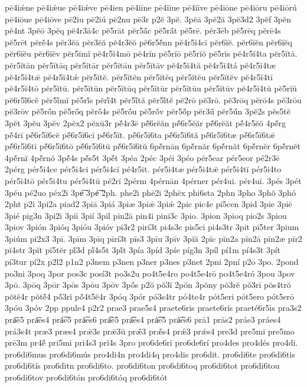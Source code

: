 {pē4iǽne
pē4iǽue
pē4iǽve
pē4ien
pē4iīne
pē4iīue
pē4iīve
pē4iōne
pē4iōru
pē4iōrú
pē4iōue
pē4iōve
pē2iu
pē2iú
pē2nu
pē3r
p2ĕ
3pĕ.
3pĕā
3pĕ2ă
3pĕ3d2
3pĕf
3pĕn
pĕ4nt
3pĕō
3pĕq
pĕ4r3ā4c
pĕ5rāt
pĕr5ā́c
pĕ5rā́t
pĕ5rē.
pĕr3ēb
pĕ5rēq
pĕrē4s
pĕ5rēt
pĕrḗ4s
pĕr3ĕā
pĕr3ĕă
pĕ4r3ĕŏ
pĕ6r5ĕ́nn
pĕ4r5ĭ4cī
pĕr6ĭĕ.
pĕr6ĭĕn
pĕr6ĭĕq
pĕr6ĭĕu
pĕr6ĭĕv
pĕr5ĭmĭ
pĕ4r5ĭ4mō
pĕ4rĭn
pĕ5rĭō
pĕ5rĭŏ
pĕ5rĭs
pĕ4r5ĭ4ta
pĕr5ĭtā.
pĕr5ĭtān
pĕr5ĭtāq
pĕr5ĭtār
pĕr5ĭtāu
pĕr5ĭtāv
pĕ4r5ĭ4tă
pĕ4r5ĭ4tá
pĕ4r5ĭ4tæ
pĕ4r5ĭ4tǣ
pĕ4r5ĭ4tǽ
pĕr5ĭtĕ.
pĕr5ĭtĕn
pĕr5ĭtĕq
pĕr5ĭtĕu
pĕr5ĭtĕv
pĕ4r5ĭ4tī
pĕ4r5ĭ4tō
pĕr5ĭtū.
pĕr5ĭtūn
pĕr5ĭtūq
pĕr5ĭtūr
pĕr5ĭtūu
pĕr5ĭtūv
pĕ4r5ĭ4tŭ
pĕ5rĭŭ
pĕ6r5ĭ́6cĕ
pĕr5ĭ́mĭ
pĕ5rĭ́s
pĕrĭ́4t
pĕr5ĭ́tă
pĕr5ĭ́tĕ
pĕ2rō
pĕ3rō.
pĕ3rōq
pĕrō4s
pĕ3rōu
pĕ3rōv
pĕ5rṓn
pĕ5rṓq
pĕrṓ4s
pĕ5rṓu
pĕ5rṓv
pĕr5ŏ́p
pĕr3ū́
pĕr5ŭ́n
3pĕ2s
pĕs5tĕ
3pĕt
3pĕu
3pĕv
2pĕx2
pĕxū3r
pĕ́4r3ē
pĕ́6rĕăn
pĕ́6r5ĕăr
pĕ́6rĕăt
pĕ́4r5ĕŏ
4pĕ́rg
pĕ́4rī
pĕ́6r5ĭ6cĕ
pĕ́6r5ĭ6cī
pĕ́6r5ĭt.
pĕ́6r5ĭ6ta
pĕ́6r5ĭ6tă
pĕ́6r5ĭ6tæ
pĕ́6r5ĭ6tǣ
pĕ́6r5ĭ6tī
pĕ́6r5ĭ6tō
pĕ́6r5ĭ6tū
pĕ́6r5ĭ6tŭ
6pĕ́rnān
6pĕ́rnăr
6pĕ́rnăt
6pĕ́rnĕr
6pĕ́rnĕt
4pĕ́rnĭ
4pĕ́rnŏ
3pĕ́4s
pĕ́s5t
3pĕ́t
3péa
2péc
3péi
3péo
pér5ear
pér5eor
pé2r3ē
2pérg
pér5i4ce
pér5i4ci
pér5i4cī
pé4r5it.
pér5i4tæ
pér5i4tǣ
pér5i4tī
pér5i4to
pér5i4tō
pér5i4tu
pér5i4tū
pé2rī
2pérm
4pérnān
4pérner
pér4ui.
pér4uī.
3pés
3pét
3péu
pé2uo
péx2ī
3pé͞
3pé͡
2ph.
phe2i
phē2i
2phēx
phi6sta
2phn
3pho
3phŏ
3phó
2pht
p2i
3pi2a
piad2
3piā
3piá
3piæ
3piǣ
3piǽ
2pic
pic4e
pi5cen
3pid
3pie
3piē
3pié
pig3n
3pi2i
3piī
3pií
3pil
pin2ā
pin4i
pini3c
3pio.
3pion
3pioq
pio2s
3piou
3piov
3pión
3pióq
3pióu
3pióv
pi3r2
pirí3t
pi4s3c
pis5ci
pi4s3tr
3pit
pi5ter
3pium
3piúm
pi2x3
3pī.
3pīm
3pīq
pīrí3t
pīs3
3pīu
3pīv
3pĭă
2pĭc
pĭn2a
pĭn2ā
pĭn2æ
pĭr2
pĭ4str
3pĭt
pĭ5tĕr
pĭ́3d
pĭ́4s5t
3pĭ́t
3pía
3píd
3píe
píg3n
3píl
pí1m
pí4s3t
3pít
pí3tur
pí2x
p2l2
p1n2
p3nem
p3nen
p3ner
p3nes
p3net
2pni
2pní
p2o
3po.
2pond
po3ni
3poq
3por
pos3c
posí3t
po3s2u
po4t5e4ro
po4t5e4rō
po4t5e4ró
3pou
3pov
3pō.
3pōq
3pōr
3pōs
3pōu
3pōv
3pṓs
p2ŏ
pŏ3ĭ
2pŏn
3pŏny
pŏ3rĕ
pŏ3rī
pŏs4trŏ
pŏtĕ4r
pŏtĕ́4
pŏ́3rĭ
pŏ́4t5ĕ4r
3póq
3pór
pó3s4tr
pó4te4r
pót5eri
pót5ero
pót5erō
3póu
3póv
2pp
ppule4
p2r2
prae3
prae5s4
praete6ris
praete6rís
praeté6r5is
pra3s2
pra͞e5
pra͞es4
prá͞e5
prá͞es6
pra͡e5
pra͡es4
prá͡e5
prá͡es6
prā1
prās2
práe3
práes4
prá3s4t
præ3
præs4
prǣ3s
prǣ3ŭ
prǣ́3
prǣ́s4
prǽ3
prǽs4
pre3d
pre5mi
pre5mo
prē3m
pr4ĕ́
pri5mi
pri4s3
prĭ4s
3pro
pro6de6ri
pro6de6rí
pro4des
pro4dés
pro4di.
pro6di6mus
pro6di6mús
pro4di4n
pro4di4q
pro4dis
pro6dit.
pro6di6te
pro6di6tis
pro6di6tís
pro6ditn
pro6di6to.
pro6di6ton
pro6di6toq
pro6di6tot
pro6di6tou
pro6di6tov
pro6di6tón
pro6di6tóq
pro6di6tót
}
